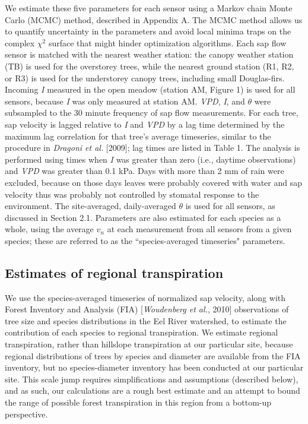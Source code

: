 We estimate these five parameters for each sensor using a Markov chain Monte Carlo (MCMC) method, described in Appendix A.  The MCMC method allows us to quantify uncertainty in the parameters and avoid local minima traps on the complex $\chi ^2$ surface that might hinder optimization algorithms.  Each sap flow sensor is matched with the nearest weather station: the canopy weather station (TB) is used for the overstorey trees, while the nearest ground station (R1, R2, or R3) is used for the understorey canopy trees, including small Douglas-firs.  Incoming \textit{I} measured in the open meadow (station AM, Figure 1) is used for all sensors, because \textit{I} was only measured at station AM.  \textit{VPD}, \textit{I}, and $\theta$ were subsampled to the 30 minute frequency of sap flow measurements.  For each tree, sap velocity is lagged relative to \textit{I} and \textit{VPD} by a lag time determined by the maximum lag correlation for that tree's average timeseries, similar to the procedure in \textit{Dragoni et al.} [2009]; lag times are listed in Table 1.  The analysis is performed using times when \textit{I} was greater than zero (i.e., daytime observations) and \textit{VPD} was greater than 0.1 kPa.  Days with more than 2 mm of rain were excluded, because on those days leaves were probably covered with water and sap velocity thus was probably not controlled by stomatal response to the environment.  The site-averaged, daily-averaged $\theta$ is used for all sensors, as discussed in Section 2.1.  Parameters are also estimated for each species as a whole, using the average $v_n$ at each measurement from all sensors from a given species; these are referred to as the ``species-averaged timeseries" parameters.

\subsection{Estimates of regional transpiration}
We use the species-averaged timeseries of normalized sap velocity, along with Forest Inventory and Analysis (FIA) [\textit{Woudenberg et al.}, 2010] observations of tree size and species distributions in the Eel River watershed, to estimate the contribution of each species to regional transpiration.  We estimate regional transpiration, rather than hillslope transpiration at our particular site, because regional distributions of trees by species and diameter are available from the FIA inventory, but no species-diameter inventory has been conducted at our particular site.  This scale jump requires simplifications and assumptions (described below), and as such, our calculations are a rough best estimate and an attempt to bound the range of possible forest transpiration in this region from a bottom-up perspective.  


